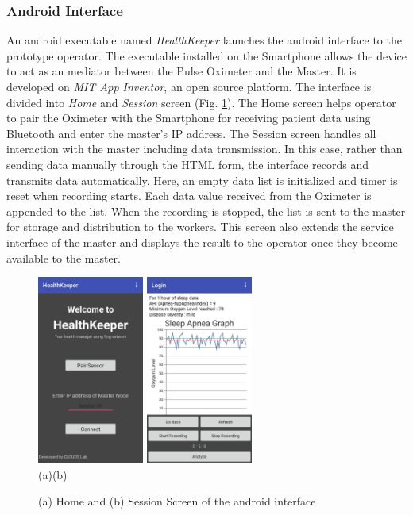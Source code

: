 \documentclass[final,5p,times,twocolumn]{elsarticle}
\begin{document}
\subsubsection{Android Interface}
An android executable named \textit{HealthKeeper} launches the android interface to the prototype operator. The executable installed on the Smartphone allows the device to act as an mediator between the Pulse Oximeter and the Master. It is developed on \textit{MIT App Inventor}, an open source platform. The interface is divided into \textit{Home} and \textit{Session} screen (Fig. \ref{fig:android}). The Home screen helps operator to pair the Oximeter with the Smartphone for receiving patient data using Bluetooth and enter the master's IP address. The Session screen handles all interaction with the master including data transmission. In this case, rather than sending data manually through the HTML form, the interface records and transmits data automatically. Here, an empty data list is initialized and timer is reset when recording starts. Each data value received from the Oximeter is appended to the list. When the recording is stopped, the list is sent to the master for storage and distribution to the workers. This screen also extends the service interface of the master and displays the result to the operator once they become available to the master.   
%
\begin{figure}[h]
	\begin{center}
	\centering
		\includegraphics[width=35mm]{Home.png}
		\hspace{20pt}
		\includegraphics[width=35mm]{Session.png}\\
        \footnotesize{(a)\hspace{120pt}(b)}\\		 
   	\caption{(a) Home and (b) Session Screen of the android interface} \label{fig:android}
	\end{center}
\end{figure}
\end{document}

